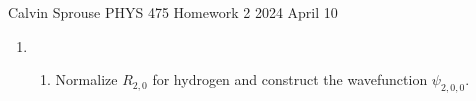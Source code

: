 \documentclass[a4paper, 12pt]{config/homework}
\begin{document}
\noindent
\hfill Calvin Sprouse \hfill PHYS 475 Homework 2 \hfill 2024 April 10 \hfill
\bigskip

\begin{enumerate}
\item \begin{enumerate}[label=(\alph*)]
\item Normalize \(R_{2,0}\) for hydrogen and construct the wavefunction \(\psi_{2,0,0}\). \bigskip



\end{enumerate}
\end{enumerate}
\end{document}
